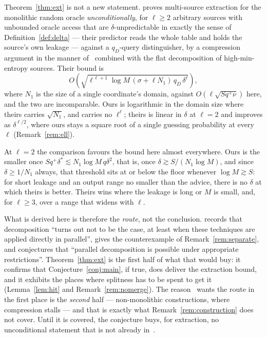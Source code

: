 \documentclass{conjura-conjecture}
\begin{document}
\begin{remark}
\label{rem:priorart}
Theorem~\ref{thm:ext} is not a new statement. \cite[Thm.~3]{CFHS} proves
multi-source extraction for the monolithic random oracle
\emph{unconditionally}, for $\ell \ge 2$ arbitrary sources with unbounded
oracle access that are $\delta$-unpredictable in exactly the sense of
Definition~\ref{def:delta} --- their predictor reads the whole table and
holds the source's own leakage --- against a $q_D$-query distinguisher, by
a compression argument in the manner of~\cite{DGK} combined with the flat
decomposition of high-min-entropy sources. Their bound is
\[
  O\!\left(\sqrt{\ell^{\,\ell+1}\log M\,(\sigma+\ell N_1)\,q_D\,
  \delta^{\ell}}\right) ,
\]
where $N_1$ is the size of a single coordinate's domain, against
$O(\ell\sqrt{Sq^{+}\nu})$ here, and the two are incomparable. Ours is
logarithmic in the domain size where theirs carries $\sqrt{N_1}$, and
carries no $\ell^{\ell}$; theirs is linear in $\delta$ at $\ell = 2$ and
improves as $\delta^{\ell/2}$, where ours stays a square root of a single
guessing probability at every $\ell$ (Remark~\ref{rem:ell}).

At $\ell = 2$ the comparison favours the bound here almost everywhere.
Ours is the smaller once $Sq^{+}\delta^{\ast} \lesssim N_1\log M\,q\delta^{2}$,
that is, once $\delta \gtrsim S/(N_1\log M)$, and since $\delta \ge 1/N_1$
always, that threshold sits at or below the floor whenever
$\log M \gtrsim S$: for short leakage and an output range no smaller than
the advice, there is no $\delta$ at which theirs is better. Theirs wins
where the leakage is long or $M$ is small, and, for $\ell \ge 3$, over a
range that widens with $\ell$.

What is derived here is therefore the \emph{route}, not the conclusion.
\cite[\S1.4]{CFHS} records that decomposition ``turns out not to be the
case, at least when these techniques are applied directly in parallel'',
gives the counterexample of Remark~\ref{rem:separate}, and conjectures
that ``parallel decomposition is possible under appropriate
restrictions''. Theorem~\ref{thm:ext} is the first half of what that would
buy: it confirms that Conjecture~\ref{conj:main}, if true, does deliver
the extraction bound, and it exhibits the places where splitness has to be
spent to get it (Lemma~\ref{lem:hit} and Remark~\ref{rem:nomerge}). The
reason~\cite{CFHS} wants the route in the first place is the \emph{second}
half --- non-monolithic constructions, where compression stalls --- and
that is exactly what Remark~\ref{rem:construction} does not cover. Until
it is covered, the conjecture buys, for extraction, no unconditional
statement that is not already in~\cite{CFHS}.
\end{remark}
\end{document}
